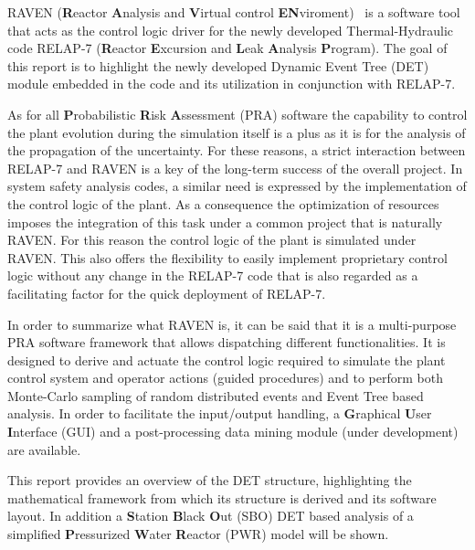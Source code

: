 \label{sec:introduction}
RAVEN (\textbf{R}eactor \textbf{A}nalysis and \textbf{V}irtual control \textbf{EN}viroment)~\cite{ravenFY12,mandelliANS2012} is a software tool that acts as the control logic driver for the newly developed Thermal-Hydraulic code RELAP-7  (\textbf{R}eactor \textbf{E}xcursion and \textbf{L}eak \textbf{A}nalysis \textbf{P}rogram). The goal of this report is to highlight the newly developed  Dynamic Event Tree (DET) module embedded in the code and its utilization in conjunction with RELAP-7. 

As for all \textbf{P}robabilistic \textbf{R}isk \textbf{A}ssessment (PRA) software the capability to control the plant evolution during the simulation itself is a plus as it is for the analysis of the propagation of the uncertainty. For these reasons, a strict interaction between RELAP-7 and RAVEN is a key of the long-term success of the overall project. In system safety analysis codes, a similar need is expressed by the implementation of the control logic of the plant. As a consequence the optimization of resources imposes the integration of this task under a common project that is naturally RAVEN. For this reason the control logic of the plant is simulated under RAVEN. This also offers the flexibility to easily implement proprietary control logic  without any change in the RELAP-7 code that is also regarded as a facilitating factor for the quick deployment of RELAP-7.

In order to summarize what RAVEN is, it can be said that it is a multi-purpose PRA software framework that allows dispatching different functionalities. 
It is designed to derive and actuate the control logic required to simulate the plant control system and operator actions (guided procedures) and to perform both Monte-Carlo sampling of random distributed events and Event Tree based analysis. 
In order to facilitate the input/output handling, a \textbf{G}raphical \textbf{U}ser \textbf{I}nterface (GUI) and a post-processing data mining module (under development) are available.

This report provides an overview of the DET structure, highlighting the mathematical framework from which its structure is derived and its software layout. In addition a \textbf{S}tation \textbf{B}lack \textbf{O}ut (SBO) DET based analysis of a simplified \textbf{P}ressurized \textbf{W}ater \textbf{R}eactor (PWR) model will be shown.
\vspace{-5mm}



